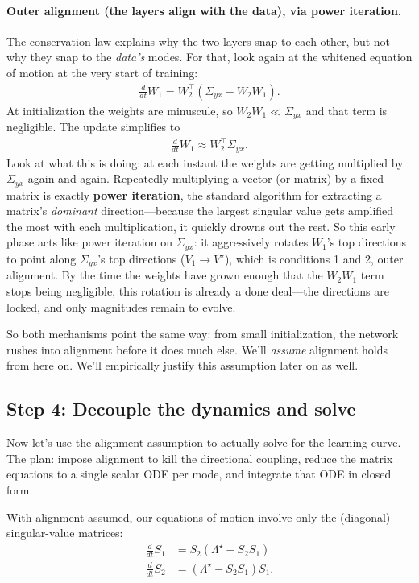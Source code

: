 \paragraph{Outer alignment (the layers align with the data), via power iteration.}
The conservation law explains why the two layers snap to each other, but not why
they snap to the \emph{data's} modes. For that, look again at the whitened
equation of motion at the very start of training:
\begin{align*}
    \frac{d}{dt}W_1 = W_2^\top(\Sigma_{yx} - W_2 W_1).
\end{align*}
At initialization the weights are minuscule, so $W_2 W_1 \ll \Sigma_{yx}$ and that
term is negligible. The update simplifies to
\begin{align*}
    \frac{d}{dt}W_1 \approx W_2^\top \Sigma_{yx}.
\end{align*}
Look at what this is doing: at each instant the weights are getting multiplied by
$\Sigma_{yx}$ again and again. Repeatedly multiplying a vector (or matrix) by a
fixed matrix is exactly \textbf{power iteration}, the standard algorithm for
extracting a matrix's \emph{dominant} direction---because the largest singular
value gets amplified the most with each multiplication, it quickly drowns out the
rest. So this early phase acts like power iteration on $\Sigma_{yx}$: it
aggressively rotates $W_1$'s top directions to point along $\Sigma_{yx}$'s top
directions ($V_1 \to V^\star$), which is conditions 1 and 2, outer alignment. By
the time the weights have grown enough that the $W_2 W_1$ term stops being
negligible, this rotation is already a done deal---the directions are locked, and
only magnitudes remain to evolve.

So both mechanisms point the same way: from small initialization, the network
rushes into alignment before it does much else. We'll \emph{assume} alignment
holds from here on. We'll empirically justify this assumption later on as well.

\subsection{Step 4: Decouple the dynamics and solve}

Now let's use the alignment assumption to actually solve for the learning curve.
The plan: impose alignment to kill the directional coupling, reduce the matrix
equations to a single scalar ODE per mode, and integrate that ODE in closed form.

With alignment assumed, our equations of motion involve only the (diagonal)
singular-value matrices:
\begin{align}
    \frac{d}{dt}S_1 &= S_2 (\Lambda^\star - S_2 S_1)\\
    \frac{d}{dt}S_2 &= (\Lambda^\star - S_2 S_1) S_1.
\end{align}

